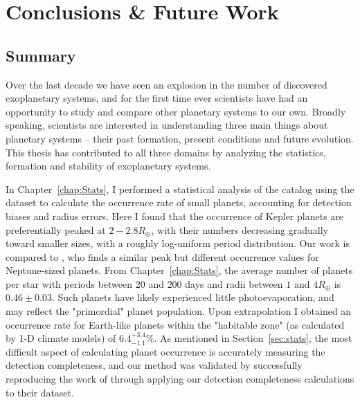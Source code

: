 \chapter{Conclusions \& Future Work}
\section{Summary}
Over the last decade we have seen an explosion in the number of discovered exoplanetary systems, and for the first time ever scientists have had an opportunity to study and compare other planetary systems to our own. 
Broadly speaking, scientists are interested in understanding three main things about planetary systems -- their past formation, present conditions and future evolution. 
This thesis has contributed to all three domains by analyzing the statistics, formation and stability of exoplanetary systems. 

In Chapter~\ref{chap:Stats}, I performed a statistical analysis of the \kep catalog using the \citet{Ramirez2014} dataset to calculate the occurrence rate of small planets, accounting for detection biases and radius errors. 
Here I found that the occurrence of Kepler planets are preferentially peaked at $2-2.8R_\oplus$, with their numbers decreasing gradually toward smaller sizes, with a roughly log-uniform period distribution.
Our work is compared to \citet{Petigura2013}, who finds a similar peak but different occurrence values for Neptune-sized planets. 
From Chapter~\ref{chap:Stats}, the average number of planets per star with periods between $20$ and $200$ days and radii between $1$ and $4R_\oplus$ is $0.46 \pm 0.03$. 
Such planets have likely experienced little photoevaporation, and may reflect the "primordial" planet population. 
Upon extrapolation I obtained an occurrence rate for Earth-like planets within the "habitable zone" (as calculated by 1-D climate models) of $6.4^{+3.4}_{-1.1}\%$. 
As mentioned in Section~\ref{sec:stats}, the most difficult aspect of calculating planet occurrence is accurately measuring the detection completeness, and our method was validated by successfully reproducing the work of \citet{Petigura2013} through applying our detection completeness calculations to their dataset.

